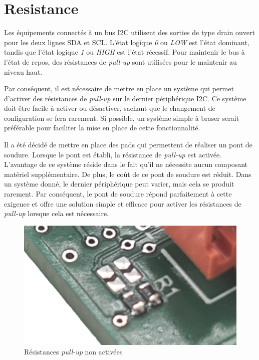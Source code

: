 \section{Resistance}

Les équipements connectés à un bus I2C utilisent des sorties de type drain ouvert pour les deux lignes SDA et SCL.
L'état logique \textit{0} ou \textit{LOW} est l'état dominant, tandis que l'état logique \textit{1} ou \textit{HIGH} est l'état récessif.
Pour maintenir le bus à l'état de repos, des résistances de \textit{pull-up} sont utilisées pour le maintenir au niveau haut.

Par conséquent, il est nécessaire de mettre en place un système qui permet d'activer des résistances de \textit{pull-up} sur le dernier périphérique I2C.
Ce système doit être facile à activer ou désactiver, sachant que le changement de configuration se fera rarement.
Si possible, un système simple à braser serait préférable pour faciliter la mise en place de cette fonctionnalité.

Il a été décidé de mettre en place des pads qui permettent de réaliser un pont de soudure.
Lorsque le pont est établi, la résistance de \textit{pull-up} est activée.
L'avantage de ce système réside dans le fait qu'il ne nécessite aucun composant matériel supplémentaire.
De plus, le coût de ce pont de soudure est réduit.
Dans un système donné, le dernier périphérique peut varier, mais cela se produit rarement.
Par conséquent, le pont de soudure répond parfaitement à cette exigence et offre une solution simple et efficace pour activer les résistances de \textit{pull-up} lorsque cela est nécessaire.

\begin{figure}[H]
    \centering
    \includegraphics[scale=0.08]{./assets/figures/resistance_desactive.jpg}
    \caption{Résistances \textit{pull-up} non activées}
\end{figure}

